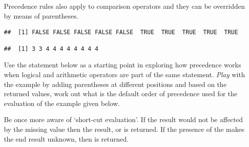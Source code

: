 \documentclass[krantz2]{krantz}\usepackage{knitr}%
\begin{document}
Precedence rules also apply to comparison operators and they can be overridden by means of parentheses.

\begin{knitrout}\footnotesize
{}\color{fgcolor}\begin{kframe}
\begin{alltt}
 \hlopt{>}  \hlopt{+} 
\end{alltt}
\begin{verbatim}
##  [1] FALSE FALSE FALSE FALSE FALSE  TRUE  TRUE  TRUE  TRUE  TRUE
\end{verbatim}
\begin{alltt}
 \hlopt{>} \hlstd{)} \hlopt{+} 
\end{alltt}
\begin{verbatim}
##  [1] 3 3 4 4 4 4 4 4 4 4
\end{verbatim}
\end{kframe}
\end{knitrout}

\begin{playground}
Use the statement below as a starting point in exploring how precedence works when logical and arithmetic operators are part of the same statement. \emph{Play} with the example by adding parentheses at different positions and based on the returned values, work out what is the default order of precedence used for the evaluation of the example given below.

\begin{knitrout}\footnotesize
{}\color{fgcolor}\begin{kframe}
\begin{alltt}
 \hlkwb{<-} \hlopt{:}
 \hlopt{>}  \hlopt{|}  \hlopt{+}  \hlopt{<} 
\end{alltt}
\end{kframe}
\end{knitrout}
\end{playground}

Be once more aware of `short-cut evaluation'. If the result would not be affected by the missing value then the result,  or  is returned. If the presence of the  makes the end result unknown, then  is returned.
\end{document}
